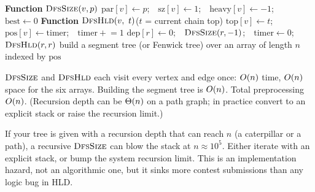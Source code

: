 \begin{algorithm}[H]
\caption{\textsc{Decompose}: build heavy-light positions}
\label{ch19:alg-build}
\DontPrintSemicolon
{}
\BlankLine
\textbf{Function} $\textsc{DfsSize}(v,p)$\;
\quad $\mathrm{par}[v]\gets p$;\ \ $\mathrm{sz}[v]\gets 1$;\ \ $\mathrm{heavy}[v]\gets -1$;\ \ $\mathrm{best}\gets 0$\;
\quad {}
\BlankLine
\textbf{Function} $\textsc{DfsHld}(v,\ t)$\quad\textnormal{($t$ = current chain top)}\;
\quad $\mathrm{top}[v]\gets t$;\ \ $\mathrm{pos}[v]\gets \mathrm{timer}$;\ \ $\mathrm{timer}\mathrel{+}=1$\;
\quad {}
\quad {}
\BlankLine
$\mathrm{dep}[r]\gets 0$;\ \ $\textsc{DfsSize}(r,-1)$;\ \ $\mathrm{timer}\gets 0$;\ \ $\textsc{DfsHld}(r,r)$\;
build a segment tree (or Fenwick tree) over an array of length $n$ indexed by $\mathrm{pos}$\;
\end{algorithm}

\begin{complexitybox}
$\textsc{DfsSize}$ and $\textsc{DfsHld}$ each visit every vertex and edge once: $O(n)$ time,
$O(n)$ space for the six arrays. Building the segment tree is $O(n)$. Total preprocessing
$O(n)$. (Recursion depth can be $\Theta(n)$ on a path graph; in practice convert to an explicit stack
or raise the recursion limit.)
\end{complexitybox}

\begin{trapbox}
If your tree is given with a recursion depth that can reach $n$ (a caterpillar or a path), a recursive
$\textsc{DfsSize}$ can blow the stack at $n\approx 10^5$. Either iterate with an explicit stack, or
bump the system recursion limit. This is an implementation hazard, not an algorithmic one, but it
sinks more contest submissions than any logic bug in HLD.
\end{trapbox}

